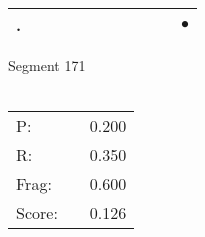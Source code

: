 \documentclass[landscape]{article}
\newcommand{\ssp}{\hspace{2pt}}
\newcommand{\mex}{\cellcolor{g}$\bullet$}
\begin{document}
\begin{tabular}{|l|p{10pt}|p{10pt}|p{10pt}|p{10pt}|p{10pt}|p{10pt}|p{10pt}|p{10pt}|p{10pt}|p{10pt}|}
\hline
\ssp \cellcolor{ref9}. \ssp&\hspace{2pt}&\hspace{2pt}&\hspace{2pt}&\hspace{2pt}&\hspace{2pt}&\hspace{2pt}&\hspace{2pt}&\hspace{2pt}&\hspace{2pt}&\hspace{2pt}\mex\\
\hline
\end{tabular}

\vspace{6pt}
\noindent Segment 171\\\\
\noindent\begin{tabular}{lm{12pt}r}
\hline
P:&&0.200\\
R:&&0.350\\
Frag:&&0.600\\
Score:&&0.126\\
\end{tabular}

\newpage
\end{document}
